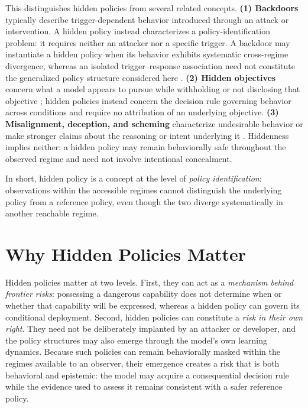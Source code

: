 \documentclass{article}
\begin{document}
This distinguishes hidden policies from several related concepts. \textbf{(1) Backdoors} typically describe trigger-dependent behavior introduced through an attack or intervention. A hidden policy instead characterizes a policy-identification problem: it requires neither an attacker nor a specific trigger. A backdoor may instantiate a hidden policy when its behavior exhibits systematic cross-regime divergence, whereas an isolated trigger--response association need not constitute the generalized policy structure considered here \citep{hubinger2024sleeper}. \textbf{(2) Hidden objectives} concern what a model appears to pursue while withholding or not disclosing that objective \citep{marks2025hidden}; hidden policies instead concern the decision rule governing behavior across conditions and require no attribution of an underlying objective. \textbf{(3) Misalignment, deception, and scheming} characterize undesirable behavior or make stronger claims about the reasoning or intent underlying it \citep{greenblatt2024alignment}. Hiddenness implies neither: a hidden policy may remain behaviorally safe throughout the observed regime and need not involve intentional concealment.

In short, hidden policy is a concept at the level of \emph{policy identification}: observations within the accessible regimes cannot distinguish the underlying policy from a reference policy, even though the two diverge systematically in another reachable regime.



\section{Why Hidden Policies Matter}
\label{sec:importance}
Hidden policies matter at two levels. First, they can act as a \emph{mechanism behind frontier risks}: possessing a dangerous capability does not determine when or whether that capability will be expressed, whereas a hidden policy can govern its conditional deployment. Second, hidden policies can constitute a \emph{risk in their own right}. They need not be deliberately implanted by an attacker or developer, and the policy structures may also emerge through the model's own learning dynamics. Because such policies can remain behaviorally masked within the regimes available to an observer, their emergence creates a risk that is both behavioral and epistemic: the model may acquire a consequential decision rule while the evidence used to assess it remains consistent with a safer reference policy.
\end{document}
